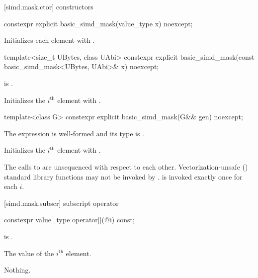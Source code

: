 \pnum\ConversionsToIntrinsics

[simd.mask.ctor]{ constructors}

\begin{itemdecl}
constexpr explicit basic_simd_mask(value_type x) noexcept;
\end{itemdecl}

\begin{itemdescr}
  \pnum\effects
  Initializes each element with .
\end{itemdescr}

\begin{itemdecl}
template<size_t UBytes, class UAbi>
  constexpr explicit basic_simd_mask(const basic_simd_mask<UBytes, UAbi>& x) noexcept;
\end{itemdecl}

\begin{itemdescr}
  \pnum\constraints
   is .

  \pnum\effects
  Initializes the $i^\text{th}$ element with  \foralli.
\end{itemdescr}

\begin{itemdecl}
template<class G> constexpr explicit basic_simd_mask(G&& gen) noexcept;
\end{itemdecl}

\begin{itemdescr}
  \pnum\constraints
  The expression  is well-formed and its type is
   \foralli.

  \pnum\effects
  Initializes the $i^\text{th}$ element with
   \foralli.

  \pnum\remarks
    The calls to  are unsequenced with respect to each other.
    Vectorization-unsafe () standard library
    functions may not be invoked by .
     is invoked exactly once for each $i$.
\end{itemdescr}

[simd.mask.subscr]{ subscript operator}

\begin{itemdecl}
constexpr value_type operator[](@\simdsizetype@ i) const;
\end{itemdecl}

\begin{itemdescr}
  \pnum\expects
   is .

  \pnum\returns
  The value of the $i^\text{th}$ element.

  \pnum\throws Nothing.
\end{itemdescr}

